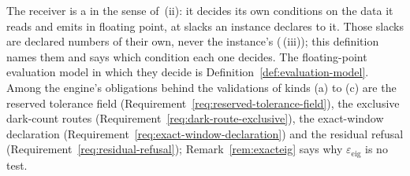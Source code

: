
The receiver is a  in the sense of
\,(ii): it decides its own conditions on the
data it reads and emits in floating point, at slacks an instance declares to
it. Those slacks are declared numbers of their own, never the instance's
 (\,(iii)); this
definition names them and says which condition each one decides. The
floating-point evaluation model in which they decide is
Definition~\ref{def:evaluation-model}. Among the engine's obligations behind the
validations of kinds (a) to (c) are the reserved tolerance field
(Requirement~\ref{req:reserved-tolerance-field}), the exclusive dark-count
routes (Requirement~\ref{req:dark-route-exclusive}), the exact-window
declaration (Requirement~\ref{req:exact-window-declaration}) and the residual
refusal (Requirement~\ref{req:residual-refusal}); Remark~\ref{rem:exacteig}
says why $\varepsilon_{\mathrm{eig}}$ is no test.

